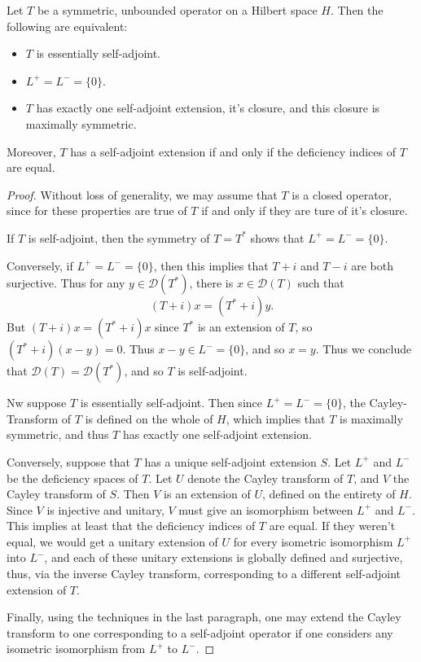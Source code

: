 \begin{theorem}
    Let $T$ be a symmetric, unbounded operator on a Hilbert space $H$. Then the following are equivalent:
    \begin{itemize}
        \item $T$ is essentially self-adjoint.
        \item $L^+ = L^- = \{ 0 \}$.
        \item $T$ has exactly one self-adjoint extension, it's closure, and this closure is maximally symmetric.
    \end{itemize}
    Moreover, $T$ has a self-adjoint extension if and only if the deficiency indices of $T$ are equal.
\end{theorem}
\begin{proof}
    Without loss of generality, we may assume that $T$ is a closed operator, since for these properties are true of $T$ if and only if they are ture of it's closure.

    If $T$ is self-adjoint, then the symmetry of $T = T^*$ shows that $L^+ = L^- = \{ 0 \}$.

    Conversely, if $L^+ = L^- = \{ 0 \}$, then this implies that $T + i$ and $T - i$ are both surjective. Thus for any $y \in \mathcal{D}(T^*)$, there is $x \in \mathcal{D}(T)$ such that
    \[ (T + i)x = (T^* + i)y. \]
    But $(T + i)x = (T^* + i)x$ since $T^*$ is an extension of $T$, so $(T^* + i)(x - y) = 0$. Thus $x - y \in L^- = \{ 0 \}$, and so $x = y$. Thus we conclude that $\mathcal{D}(T) = \mathcal{D}(T^*)$, and so $T$ is self-adjoint.

    Nw suppose $T$ is essentially self-adjoint. Then since $L^+ = L^- = \{ 0 \}$, the Cayley-Transform of $T$ is defined on the whole of $H$, which implies that $T$ is maximally symmetric, and thus $T$ has exactly one self-adjoint extension.

    Conversely, suppose that $T$ has a unique self-adjoint extension $S$. Let $L^+$ and $L^-$ be the deficiency spaces of $T$. Let $U$ denote the Cayley transform of $T$, and $V$ the Cayley transform of $S$. Then $V$ is an extension of $U$, defined on the entirety of $H$. Since $V$ is injective and unitary, $V$ must give an isomorphism between $L^+$ and $L^-$. This implies at least that the deficiency indices of $T$ are equal. If they weren't equal, we would get a unitary extension of $U$ for every isometric isomorphism $L^+$ into $L^-$, and each of these unitary extensions is globally defined and surjective, thus, via the inverse Cayley transform, corresponding to a different self-adjoint extension of $T$.

    Finally, using the techniques in the last paragraph, one may extend the Cayley transform to one corresponding to a self-adjoint operator if one considers any isometric isomorphism from $L^+$ to $L^-$.
\end{proof}

